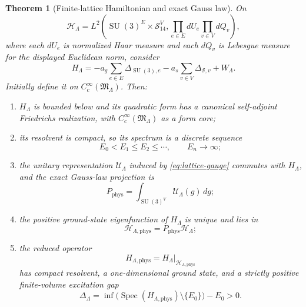 \documentclass[11pt]{article}
\newtheorem{theorem}{Theorem}[section]
\theoremstyle{definition}
\theoremstyle{remark}
\newcommand{\SU}{\operatorname{SU}}
\newcommand{\Spec}{\operatorname{Spec}}
\begin{document}
\begin{theorem}[Finite-lattice Hamiltonian and exact Gauss law]\label{thm:lattice-H}
On
\begin{equation}\label{eq:lattice-Hilbert}
 \mathscr H_\Lambda
 =L^2\!\left(
 \SU(3)^E\times\mathcal S_{14}^{V},
 \prod_{e\in E}dU_e\prod_{v\in V}dQ_v
 \right),
\end{equation}
where each $dU_e$ is normalized Haar measure and each $dQ_v$ is Lebesgue
measure for the displayed Euclidean norm, consider
\begin{equation}\label{eq:lattice-Hamiltonian}
 H_\Lambda
 =-a_g\sum_{e\in E}\Delta_{\SU(3),e}
  -a_s\sum_{v\in V}\Delta_{\mathcal S,v}
  +W_\Lambda.
\end{equation}
Initially define it on $C_c^\infty(\mathfrak M_\Lambda)$.  Then:
\begin{enumerate}
\item $H_\Lambda$ is bounded below and its quadratic form has a canonical
self-adjoint Friedrichs realization, with
$C_c^\infty(\mathfrak M_\Lambda)$ as a form core;
\item its resolvent is compact, so its spectrum is a discrete sequence
\[
 E_0<E_1\leq E_2\leq\cdots,\qquad E_n\to\infty;
\]
\item the unitary representation $\mathcal U_\Lambda$ induced by
\eqref{eq:lattice-gauge} commutes with $H_\Lambda$, and the exact Gauss-law
projection is
\begin{equation}\label{eq:Gauss-projector}
 \boxed{
 P_{\mathrm{phys}}
 =\int_{\SU(3)^V}\mathcal U_\Lambda(g)\,dg;}
\end{equation}
\item the positive ground-state eigenfunction of $H_\Lambda$ is unique and
lies in
\[
 \mathscr H_{\Lambda,\mathrm{phys}}
 =P_{\mathrm{phys}}\mathscr H_\Lambda;
\]
\item the reduced operator
\begin{equation}\label{eq:Hphys}
 H_{\Lambda,\mathrm{phys}}
 =H_\Lambda\big|_{\mathscr H_{\Lambda,\mathrm{phys}}}
\end{equation}
has compact resolvent, a one-dimensional ground state, and a strictly positive
finite-volume excitation gap
\begin{equation}\label{eq:finite-gap}
 \boxed{
 \Delta_\Lambda
 =\inf\bigl(\Spec(H_{\Lambda,\mathrm{phys}})\setminus\{E_0\}\bigr)-E_0
 >0.}
\end{equation}
\end{enumerate}
\end{theorem}
\end{document}
